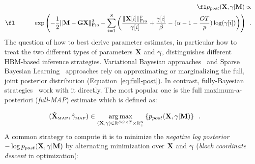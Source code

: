 \begin{eqnarray}
\label{eq:full-post}
\fl \hipost \propto \nonumber \\
\fl \hspace{3em} \exp \left( - \frac{1}{2} \fronormsq{\bfM - \bfG \bfX} - \sum_{i=1}^S \left( \frac{\fronorm{\bfX[i]}^p}{\mathbf{\gamma}[i]} + \frac{\mathbf{\gamma}[i]}{\beta} - (\alpha - 1 - \frac{OT}{p}) \log(\mathbf{\gamma}[i]) \right) \right)\enspace.
\end{eqnarray}
The question of how to best derive parameter estimates, in particular how to treat the two different types of parameters $\mathbf{X}$ and $\mathbf{\gamma}$, distinguishes different HBM-based inference strategies. Variational Bayesian approaches~\cite{mackay2003information,jordan1999introduction,sato2004hierarchical,FrHaDaKiPhTrHeFlMa08,shervashidze2015learning} and Sparse Bayesian Learning~\cite{tipping2001sparse,wipf2004sparse,Wipf-Nagarajan:2009,zhang-rao:2011} approaches rely on approximating or marginalizing the full, joint posterior distribution (Equation~\eqref{eq:full-post}). In contrast, fully-Bayesian strategies~\cite{CaHaPuSo09,Lucka-etal:2012} work with it directly. The most popular one is the full maximum-a-posteriori (\emph{full-MAP}) estimate which is defined as:

\begin{eqnarray}
(\xMAP,\gamMAP) & \in \argmax_{(\bfX,\mathbf{\gamma}) \in\R^{SO \times T} \times \R^{n}_+} \left\lbrace \hipost \right\rbrace \enspace.%
\end{eqnarray}
A common strategy  to compute it is to minimize the \emph{negative log posterior} $-\log p_{post}(\mathbf{X},\gamma|\mathbf{M})$ by alternating  minimization over $\mathbf{X}$ and $\mathbf{\gamma}$ (\emph{block coordinate descent} in optimization):

